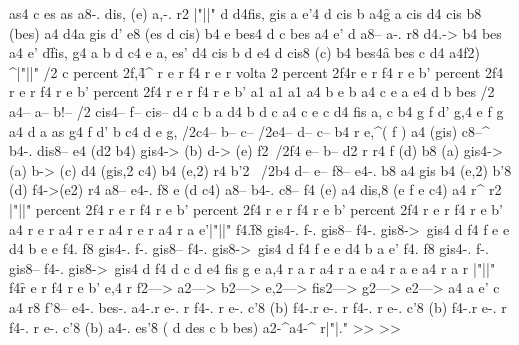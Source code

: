 {{{{as4 c es as
a8-. dis, (e) a,-. r2 \bar"||" \key d \major 
d4\mf fis, gis a
e'4\< d cis b
a4\f g a cis 
d4 \> cis b8 (bes) a4
d4\mf a gis d' 
e8 \> (es d cis) b4 e\!
bes4 d c bes 
a4 e' d a8-- a-.
r8 d4.-> b4 bes 
a4 e' d\f fis,
g4 a b d 
c4 e a, es' 
d4 cis b d 
e4\< d cis8 (c) b4 
bes4\f a bes c 
d4\fermata {} a4\glissando f2) ^\fermata \bar"||" /2 \key c \major 
\repeat percent 2{f,4\f^  r e r 
f4  r e r }
\repeat volta 2{
\repeat percent 2{f4\mf r e r 
f4  r e b'}
\repeat percent 2{f4 r e r 
f4  r e b'}
\repeat percent 2{f4 r e r 
f4  r e b'}
a1 
a1
a1 
}
a4 b e b 
a4 c e a 
e4 d b bes 
/2 {a4-- a-- b!--} /2 {cis4-- f-- cis--}
d4 c b a 
d4 b d c 
a4 c e c 
d4 fis a, c 
b4 g f d' 
g,4 e f g 
a4 d a as
g4 f d' b 
c4 d e g, 
/2{c4-- b-- c-- }/2{e4-- d-- c-- }
b4 r e,^\mf ( f )
a4 (gis) c8--^ b4-. dis8--
e4 (d2 b4) 
gis4-> (b) d-> (e) 
f2~/2{f4 e-- b--} 
d2 r 
r4 f (d) b8 (a) 
gis4-> (a) b-> (c) 
d4 (gis,2 c4) 
b4 (e,2) r4 
b'2 ~/2{b4 d-- e--}
f8-- e4-. b8 a4 gis
b4 (e,2) b'8 (d) 
f4->(e2) r4 
a8-- e4-. f8 e (d c4) 
a8-- b4-. c8-- f4 (e) 
a4 dis,8 (e f e c4) 
a4 r^ r2 \bar"||"
\repeat percent 2{f4 r e r 
f4  r e b'}
\repeat percent 2{f4 r e r 
f4  r e b'}
\repeat percent 2{f4 r e r 
f4  r e b'}
a4 r e r 
a4 r e r 
a4 r e r 
a4 r a e'\bar"||"
f4.\f f8 gis4-. f-. 
gis8-- f4-. gis8->~gis4 d
f4 f e e 
d4 b e e 
f4. f8 gis4-. f-. 
gis8-- f4-. gis8->~gis4 d
f4 f e e 
d4 b a e'
f4. f8 gis4-. f-. 
gis8-- f4-. gis8->~gis4 d
f4 d c d 
e4 fis g e
a,4 r a r 
a4 r a e
a4 r a e
a4\< r a r \bar"||"
f4\f r e r 
f4 r e b'
e,4 r f2--->
a2---> b2--->
e,2---> fis2--->
g2---> e2--->
a4 a e' c 
a4 r8 f'8--\> e4-. bes-. 
a4-.\mf r e-. r 
f4-. r e-. c'8\> (b) 
f4-.\p r e-. r 
f4-. r e-. c'8\> (b) 
f4-.\pp r e-. r 
f4-. r e-. c'8\> (b) 
a4-.\! es'8\f \< ( d des c b bes)
a2-^\ff a4-^ r\bar"|."
} }  
         >>
      >>
    }  

    \markup {
        \column{

        }
    }
}

